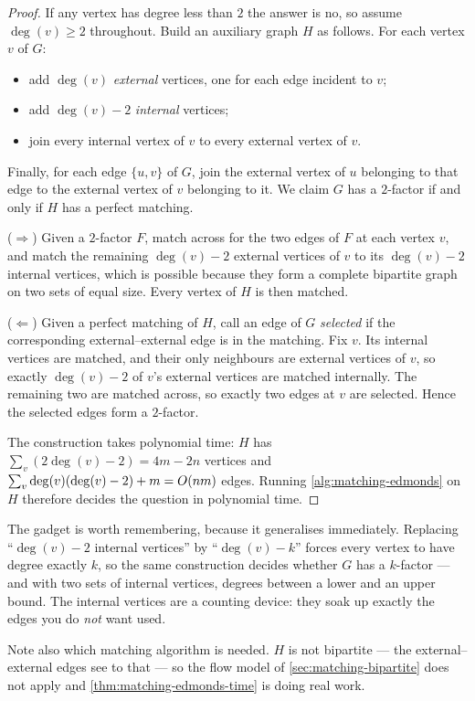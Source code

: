 \begin{proof}
If any vertex has degree less than $2$ the answer is no, so assume
$\deg(v) \ge 2$ throughout. Build an auxiliary graph $H$ as follows. For each
vertex $v$ of $G$:
\begin{itemize}[nosep]
  \item add $\deg(v)$ \emph{external} vertices, one for each edge incident to
        $v$;
  \item add $\deg(v) - 2$ \emph{internal} vertices;
  \item join every internal vertex of $v$ to every external vertex of $v$.
\end{itemize}
Finally, for each edge $\{u,v\}$ of $G$, join the external vertex of $u$
belonging to that edge to the external vertex of $v$ belonging to it. We claim
$G$ has a $2$-factor if and only if $H$ has a perfect matching.

($\Rightarrow$) Given a $2$-factor $F$, match across for the two edges of $F$ at
each vertex $v$, and match the remaining $\deg(v)-2$ external vertices of $v$ to
its $\deg(v)-2$ internal vertices, which is possible because they form a
complete bipartite graph on two sets of equal size. Every vertex of $H$ is then
matched.

($\Leftarrow$) Given a perfect matching of $H$, call an edge of $G$
\emph{selected} if the corresponding external--external edge is in the matching.
Fix $v$. Its internal vertices are matched, and their only neighbours are
external vertices of $v$, so exactly $\deg(v)-2$ of $v$'s external vertices are
matched internally. The remaining two are matched across, so exactly two edges
at $v$ are selected. Hence the selected edges form a $2$-factor.

The construction takes polynomial time: $H$ has $\sum_v (2\deg(v) - 2) = 4m-2n$
vertices and $\sum_v \deg(v)(\deg(v)-2) + m = O\!\left(nm\right)$ edges. Running
\cref{alg:matching-edmonds} on $H$ therefore decides the question in polynomial
time.
\end{proof}

\begin{intuition}
The gadget is worth remembering, because it generalises immediately. Replacing
``$\deg(v)-2$ internal vertices'' by ``$\deg(v)-k$'' forces every vertex to have
degree exactly $k$, so the same construction decides whether $G$ has a
$k$-factor --- and with two sets of internal vertices, degrees between a lower
and an upper bound. The internal vertices are a counting device: they soak up
exactly the edges you do \emph{not} want used.

Note also which matching algorithm is needed. $H$ is not bipartite --- the
external--external edges see to that --- so the flow model of
\cref{sec:matching-bipartite} does not apply and \cref{thm:matching-edmonds-time}
is doing real work.
\end{intuition}

